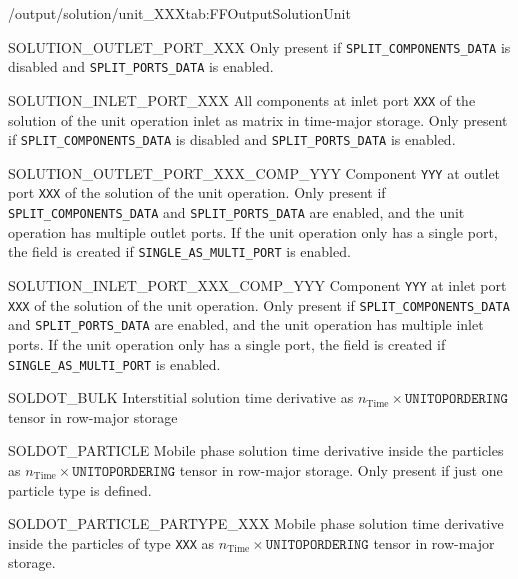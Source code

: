 \begin{groupscope}{/output/solution/unit\_XXX}{tab:FFOutputSolutionUnit}
\begin{dataset}[type=double,unit={\si{\mol\per\cubic\metre\of{IV}}}]{SOLUTION\_OUTLET\_PORT\_XXX}
    Only present if \texttt{SPLIT\_COMPONENTS\_DATA} is disabled and \texttt{SPLIT\_PORTS\_DATA} is enabled.
  \end{dataset}
  \begin{dataset}[type=double,unit={\si{\mol\per\cubic\metre\of{IV}}}]{SOLUTION\_INLET\_PORT\_XXX}
    All components at inlet port \texttt{XXX} of the solution of the unit operation inlet as matrix in time-major storage.
    Only present if \texttt{SPLIT\_COMPONENTS\_DATA} is disabled and \texttt{SPLIT\_PORTS\_DATA} is enabled.
  \end{dataset}
  \begin{dataset}[type=double,unit={\si{\mol\per\cubic\metre\of{IV}}}]{SOLUTION\_OUTLET\_PORT\_XXX\_COMP\_YYY}
    Component \texttt{YYY} at outlet port \texttt{XXX} of the solution of the unit operation.
    Only present if \texttt{SPLIT\_COMPONENTS\_DATA} and \texttt{SPLIT\_PORTS\_DATA} are enabled, and the unit operation has multiple outlet ports.
    If the unit operation only has a single port, the field is created if \texttt{SINGLE\_AS\_MULTI\_PORT} is enabled.
  \end{dataset}
  \begin{dataset}[type=double,unit={\si{\mol\per\cubic\metre\of{IV}}}]{SOLUTION\_INLET\_PORT\_XXX\_COMP\_YYY}
    Component \texttt{YYY} at inlet port \texttt{XXX} of the solution of the unit operation.
    Only present if \texttt{SPLIT\_COMPONENTS\_DATA} and \texttt{SPLIT\_PORTS\_DATA} are enabled, and the unit operation has multiple inlet ports.
    If the unit operation only has a single port, the field is created if \texttt{SINGLE\_AS\_MULTI\_PORT} is enabled.
  \end{dataset}
  \begin{dataset}[type=double,unit={\si{\mol\per\cubic\metre\of{IV}\per\second}}]{SOLDOT\_BULK}
    Interstitial solution time derivative as $n_{\text{Time}} \times \texttt{UNITOPORDERING}$ tensor in row-major storage
  \end{dataset}
  \begin{dataset}[type=double,unit={\si{\mol\per\cubic\metre\of{MP}\per\second}}]{SOLDOT\_PARTICLE}
    Mobile phase solution time derivative inside the particles as $n_{\text{Time}} \times \texttt{UNITOPORDERING}$ tensor in row-major storage.
    Only present if just one particle type is defined.
  \end{dataset}
  \begin{dataset}[type=double,unit={\si{\mol\per\cubic\metre\of{MP}\per\second}}]{SOLDOT\_PARTICLE\_PARTYPE\_XXX}
    Mobile phase solution time derivative inside the particles of type \texttt{XXX} as $n_{\text{Time}} \times \texttt{UNITOPORDERING}$ tensor in row-major storage.

\end{dataset}
\end{groupscope}
